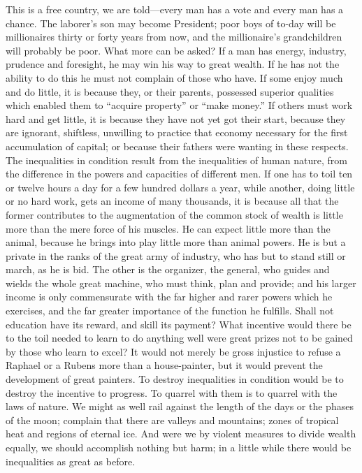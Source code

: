 \documentclass{book}
\begin{document}
This is a free country, we are told—every man has a vote and every man has a chance. The laborer’s son may become President; poor boys of to-day will be millionaires thirty or forty years from now, and the millionaire’s grandchildren will probably be poor. What more can be asked? If a man has energy, industry, prudence and foresight, he may win his way to great wealth. If he has not the ability to do this he must not complain of those who have. If some enjoy much and do little, it is because they, or their parents, possessed superior qualities which enabled them to “acquire property” or “make money.” If others must work hard and get little, it is because they have not yet got their start, because they are ignorant, shiftless, unwilling to practice that economy necessary for the first accumulation of capital; or because their fathers were wanting in these respects. The inequalities in condition result from the inequalities of human nature, from the difference in the powers and capacities of different men. If one has to toil ten or twelve hours a day for a few hundred dollars a year, while another, doing little or no hard work, gets an income of many thousands, it is because all that the former contributes to the augmentation of the common stock of wealth is little more than the mere force of his muscles. He can expect little more than the animal, because he brings into play little more than animal powers. He is but a private in the ranks of the great army of industry, who has but to stand still or march, as he is bid. The other is the organizer, the general, who guides and wields the whole great machine, who must think, plan and provide; and his larger income is only commensurate with the far higher and rarer powers which he exercises, and the far greater importance of the function he fulfills. Shall not education have its reward, and skill its payment? What incentive would there be to the toil needed to learn to do anything well were great prizes not to be gained by those who learn to excel? It would not merely be gross injustice to refuse a Raphael or a Rubens more than a house-painter, but it would prevent the development of great painters. To destroy inequalities in condition would be to destroy the incentive to progress. To quarrel with them is to quarrel with the laws of nature. We might as well rail against the length of the days or the phases of the moon; complain that there are valleys and mountains; zones of tropical heat and regions of eternal ice. And were we by violent measures to divide wealth equally, we should accomplish nothing but harm; in a little while there would be inequalities as great as before.
\end{document}
